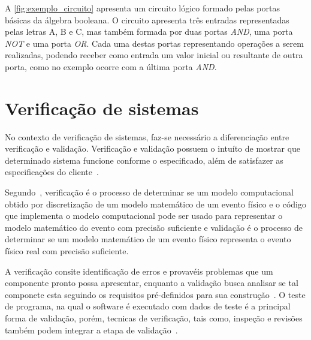 A \autoref{fig:exemplo_circuito} apresenta um circuito lógico formado pelas portas básicas da álgebra booleana. O circuito apresenta três entradas representadas pelas letras A, B e C, mas também formada por duas portas \textit{AND}, uma porta \textit{NOT} e uma porta \textit{OR}. Cada uma destas portas representando operações a serem realizadas, podendo receber como entrada um valor inicial ou resultante de outra porta, como no exemplo ocorre com a última porta \textit{AND}.



\section{Verificação de sistemas}
 No contexto de verificação de sistemas, faz-se necessário a diferenciação entre verificação e validação. Verificação e validação possuem o intuíto de mostrar que determinado sistema funcione conforme o especificado, além de satisfazer as especificações do cliente~\cite{sommerville2011engenharia}. 

\par
Segundo~\cite{sargent2005verification}, verificação é o processo de determinar se um modelo computacional obtido por discretização de um modelo matemático de um evento físico e o código que implementa o modelo computacional pode ser usado para representar o modelo matemático do evento com precisão suficiente e validação é o processo de determinar se um modelo matemático de um evento físico representa o evento físico real com precisão suficiente.

\par
A verificação consite identificação de erros e provavéis problemas que um componente pronto possa apresentar, enquanto a validação busca analisar se tal componete esta seguindo os requisitos pré-definidos para sua construção~\cite{koscianski2007qualidade}. O teste de programa, na qual o software  é executado com dados de teste é a principal forma de validação, porém, tecnicas de verificação, tais como, inspeção e revisões também podem integrar a etapa de validação~\cite{sommerville2011engenharia}.

